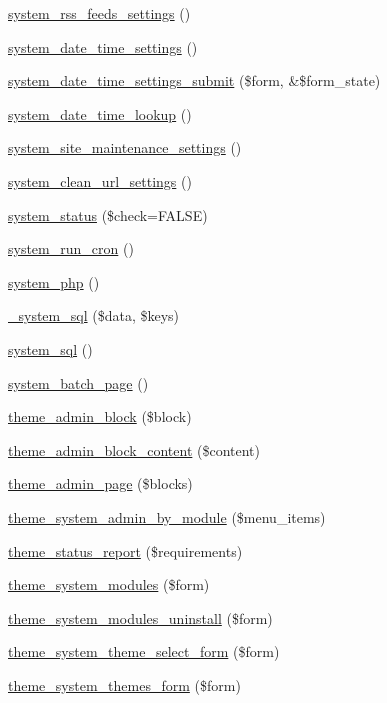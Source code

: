 \begin{CompactItemize}
\item 
\hyperlink{group__forms_gcff83234fa52dbaaf85c122bd300a374}{system\_\-rss\_\-feeds\_\-settings} ()
\item 
\hyperlink{group__forms_g2c5e3711c4a19fa4759efcee41487070}{system\_\-date\_\-time\_\-settings} ()
\item 
\hyperlink{system_8admin_8inc_ee460f082ac9517109ebaef862b5b8d7}{system\_\-date\_\-time\_\-settings\_\-submit} (\$form, \&\$form\_\-state)
\item 
\hyperlink{system_8admin_8inc_586fa7e48055bce7f644065259a29a6c}{system\_\-date\_\-time\_\-lookup} ()
\item 
\hyperlink{group__forms_g1f5acd366b9bb206d73876d3686d7fce}{system\_\-site\_\-maintenance\_\-settings} ()
\item 
\hyperlink{group__forms_g39fa3ba9127e8c9a25343c06cd9a3f1c}{system\_\-clean\_\-url\_\-settings} ()
\item 
\hyperlink{system_8admin_8inc_d24845c53f23e750918d3b1678bda951}{system\_\-status} (\$check=FALSE)
\item 
\hyperlink{system_8admin_8inc_df6e4af7e3bed308ad0dd53d1541104a}{system\_\-run\_\-cron} ()
\item 
\hyperlink{system_8admin_8inc_8b63014dfdc3c9eabbaf62ff9ef456fc}{system\_\-php} ()
\item 
\hyperlink{system_8admin_8inc_89cb86fe701bfd1e94c18ccdf2700c74}{\_\-system\_\-sql} (\$data, \$keys)
\item 
\hyperlink{system_8admin_8inc_81c56302e4a550285499e49db324c98f}{system\_\-sql} ()
\item 
\hyperlink{system_8admin_8inc_99e35456b673876eff78a38e53673068}{system\_\-batch\_\-page} ()
\item 
\hyperlink{group__themeable_gae7aed78086b8469fa3e21a6dbacbbde}{theme\_\-admin\_\-block} (\$block)
\item 
\hyperlink{group__themeable_g520c47bce2ec30cc6c834e625a28e169}{theme\_\-admin\_\-block\_\-content} (\$content)
\item 
\hyperlink{group__themeable_g397a84152a61e9517d530d8f8a2507ee}{theme\_\-admin\_\-page} (\$blocks)
\item 
\hyperlink{group__themeable_gf89acb33020a2b0dd55d410ce725ecb8}{theme\_\-system\_\-admin\_\-by\_\-module} (\$menu\_\-items)
\item 
\hyperlink{group__themeable_g4ce2716a6dfd16ef7190bcbb797dd0eb}{theme\_\-status\_\-report} (\$requirements)
\item 
\hyperlink{group__themeable_gdb0103cb92abf4193ad367528d1d060a}{theme\_\-system\_\-modules} (\$form)
\item 
\hyperlink{group__themeable_g662b8055bb00efdbfc372a42fb967ac6}{theme\_\-system\_\-modules\_\-uninstall} (\$form)
\item 
\hyperlink{group__themeable_gf0fc0dd74af2e379fa3509f7d06c4ecf}{theme\_\-system\_\-theme\_\-select\_\-form} (\$form)
\item 
\hyperlink{group__themeable_ga544bfd98c5a8b7e136fae3fd71207bc}{theme\_\-system\_\-themes\_\-form} (\$form)
\end{CompactItemize}


